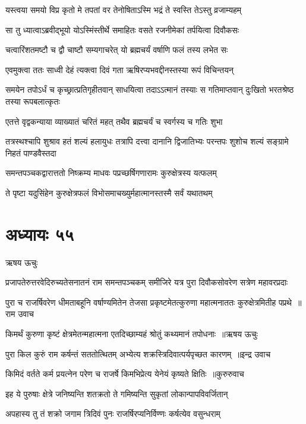 \twolineshloka
{यस्त्वया समयो विप्र कृतो मे तपतां वर}
{तेनोषिताऽस्मि भद्रं ते स्वस्ति तेऽस्तु व्रजाम्यहम्}


\twolineshloka
{सा तु ध्यात्वाऽब्रवीद्भूयो योऽस्मिंस्तीर्थे समाहितः}
{वसते रजनीमेकां तर्पयित्वा दिवौकसः}


\twolineshloka
{चत्वारिंशतमष्टौ च द्वौ चाष्टौ सम्यगाचरेत्}
{यो ब्रह्मचर्यं वर्षाणि फलं तस्य लभेत सः}


\twolineshloka
{एवमुक्त्वा ततः साध्वी देहं त्यक्त्वा दिवं गता}
{ऋषिरप्यभवद्दीनस्तस्या रूपं विचिन्तयन्}


\threelineshloka
{समयेन तपोऽर्धं च कृच्छ्रात्प्रतिगृहीतवान्}
{साधयित्वा तदाऽऽत्मानं तस्याः स गतिमाप्तवान्}
{दुःखितो भरतश्रेष्ठ तस्या रूपबलात्कृतः}


\twolineshloka
{एतत्ते वृद्वकन्याया व्याख्यातं चरितं महत्}
{तथैव ब्रह्मचर्यं च स्वर्गस्य च गतिः शुभा}


तत्रस्थश्चापि शुश्राव हतं शल्यं हलायुधः
\twolineshloka
{तत्रापि दत्त्वा दानानि द्विजातिभ्यः परन्तपः}
{शुशोच शल्यं सङ्ग्रामे निहतं पाण्डवैस्तदा}


\twolineshloka
{समन्तपञ्चकद्वारात्ततो निष्क्रम्य माधवः}
{पप्रच्छर्षिगणारामः कुरुक्षेत्रस्य यत्फलम्}


ते पृष्टा यदुसिंहेन कुरुक्षेत्रफलं विभोसमाचख्युर्महात्मानस्तस्मै सर्वं यथातथम्
\chapter{अध्यायः ५५}
\twolineshloka
{ऋषय ऊचुः}
{}


\twolineshloka
{प्रजापतेरुत्तरवेदिरुच्यतेसनातनं राम समन्तपञ्चकम्}
{समीजिरे यत्र पुरा दिवौकसोवरेण सत्रेण महावरप्रदाः}


\threelineshloka
{पुरा च राजर्षिवरेण धीमताबहूनि वर्षाण्यमितेन तेजसा}
{प्रकृष्टमेतत्कुरुणा महात्मनाततः कुरुक्षेत्रमितीह पप्रथे ॥राम उवाच}
{}


\threelineshloka
{किमर्थं कुरुणा कृष्टं क्षेत्रमेतन्महात्मना}
{एतदिच्छाम्यहं श्रोतुं कथ्यमानं तपोधनाः ॥ऋषय ऊचुः}
{}


\threelineshloka
{पुरा किल कुरुं राम कर्षन्तं सततोत्थितम्}
{अभ्येत्य शक्रस्त्रिदिवात्पर्यपृच्छत कारणम् ॥इन्द्र उवाच}
{}


\threelineshloka
{किमिदं वर्तते कर्म प्रयत्नेन परेण च}
{राजर्षे किमभिप्रेत्य येनेयं कृष्यते क्षितिः ॥कुरुरुवाच}
{}


\twolineshloka
{इह ये पुरुषाः क्षेत्रे जनिष्यन्ति शतक्रतो}
{ते गमिष्यन्ति सुकृतां लोकान्पापविवर्जितान्}


\twolineshloka
{अपहास्य तु तं शक्रो जगाम त्रिदिवं पुनः}
{राजर्षिरप्यनिर्विण्णः कर्षत्येव वसुन्धराम्}


